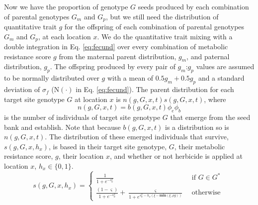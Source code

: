 \documentclass[12pt, a4paper]{article}
\begin{document}
Now we have the proportion of genotype $G$ seeds produced by each combination of parental genotypes $G_m$ and $G_p$, but we still need the distribution of quantitative trait $g$ for the offspring of each combination of parental genotypes $G_m$ and $G_p$, at each location $x$. We do the quantitative trait mixing with a double integration in Eq. \ref{eq:fecund} over every combination of metabolic resistance score $g$ from the maternal parent distribution, $g_m$, and paternal distribution, $g_p$. The offspring produced by every pair of $g_m$:$g_p$ values are assumed to be normally distributed over $g$ with a mean of $0.5g_m + 0.5g_p$ and a standard deviation of $\sigma_f$ ($\text{N}(\cdot)$ in Eq. \ref{eq:fecund}). The parent distribution for each target site genotype $G$ at location $x$ is $n(g, G, x, t)s(g, G, x, t)$, where 
\begin{equation}\label{eq:above_ground}
	n(g, G, x, t) = b(g, G, x, t)\phi_e\phi_b
\end{equation}
is the number of individuals of target site genotype $G$ that emerge from the seed bank and establish. Note that because $b(g, G, x, t)$ is a distribution so is $n(g, G, x, t)$. The distribution of these emerged individuals that survive, $s(g, G, x, h_x)$, is based in their target site genotype, $G$, their metabolic resistance score, $g$, their location $x$, and whether or not herbicide is applied at location $x$, $h_x \in \{0, 1\}$.   
\begin{equation}\label{eq:sur_G}
	s(g, G, x, h_x) = \begin{cases} 
		\frac{1}{1 + e^{-s_0^x}} &\text{~if~} G \in G^* \\
		\frac{(1 - \varsigma)}{1 + e^{-s_0^x}} + \frac{\varsigma}{1 + e^{s_0^x - h_x\left(\xi - \textbf{min}(\xi, \rho g) \right)}} &\text{~otherwise~} 		
	\end{cases} 
\end{equation}
\end{document}
